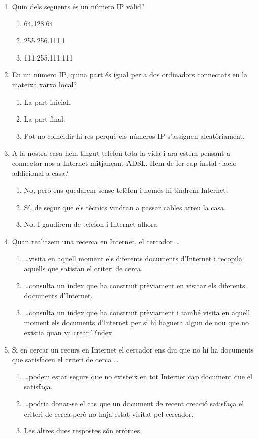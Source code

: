\begin{enumerate}
\item Quin dels següents és un número IP vàlid?
  \begin{enumerate}
  \item 64.128.64
  \item 255.256.111.1
  \item 111.255.111.111
  \end{enumerate}

\item En un número IP, quina part és igual per a dos ordinadors
  connectats en la mateixa xarxa local?
  \begin{enumerate}
  \item La part inicial.
  \item La part final.
  \item Pot no coincidir-hi res perquè els números IP s'assignen
    aleatòriament.
  \end{enumerate}

\item A la nostra casa hem tingut telèfon tota la vida i ara estem
  pensant a connectar-nos a Internet mitjançant ADSL. Hem de fer cap
  instal·lació addicional a casa?
  \begin{enumerate}
  \item No, però ens quedarem sense telèfon i només hi tindrem
    Internet.
  \item Sí, de segur que els tècnics vindran a passar cables arreu la
    casa.
  \item No. I gaudirem de telèfon i Internet alhora.
  \end{enumerate}

\item Quan realitzem una recerca en Internet, el cercador \ldots
  \begin{enumerate}
  \item \ldots visita en aquell moment els diferents documents
    d'Internet i recopila aquells que satisfan el criteri de cerca.
  \item \ldots consulta un índex que ha construït prèviament en
    visitar els diferents documents d'Internet.
  \item \ldots consulta un índex que ha construït prèviament i també
    visita en aquell moment els documents d'Internet per si hi haguera
    algun de nou que no existia quan va crear l'índex.
  \end{enumerate}

\item Si en cercar un recurs en Internet el cercador ens diu que no hi
  ha documents que satisfacen el criteri de cerca \ldots
  \begin{enumerate}
  \item \ldots podem estar segurs que no existeix en tot Internet cap
    document que el satisfaça.
  \item \ldots podria donar-se el cas que un document de recent
    creació satisfaça el criteri de cerca però no haja estat visitat
    pel cercador.
  \item Les altres dues respostes són errònies.
  \end{enumerate}


\end{enumerate}
